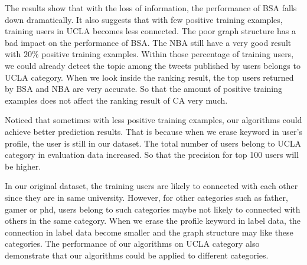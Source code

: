 \documentclass{article}
\begin{document}
The results show that with the loss of information, the performance of BSA falls down dramatically. It also suggests that with few positive training examples, training users in UCLA becomes less connected. The poor graph structure has a bad impact on the performance of BSA.
The NBA still have a very good result with $20\%$ positive training examples. Within those percentage of training users, we could already detect the topic among the tweets published by users belongs to UCLA category. When we look inside the ranking result, the top users returned by BSA and NBA are very accurate. So that the amount of positive training examples does not affect the ranking result of CA very much.

Noticed that sometimes with less positive training examples, our algorithms could achieve better prediction results. That is because when we erase keyword in user's profile, the user is still in our dataset. The total number of users belong to UCLA category in evaluation data increased. So that the precision for top 100 users will be higher.

In our original dataset, the training users are likely to connected with each other since they are in same university. However, for other categories such as father, gamer or phd, users belong to such categories maybe not likely to connected with others in the same category. When we erase the profile keyword in label data, the connection in label data become smaller and the graph structure may like these categories. The performance of our algorithms on UCLA category also demonstrate that our algorithms could be applied to different categories.

\ifx \allfiles \undefined
\end{document}
